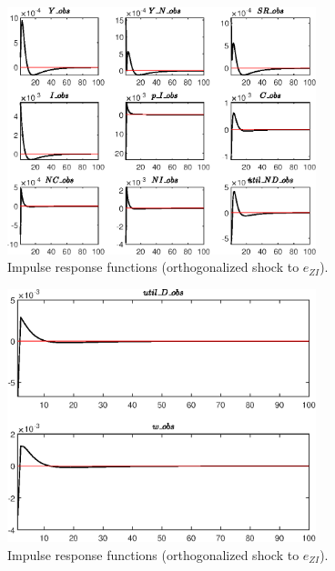 \begin{figure}[H]
\centering 
\includegraphics[width=0.80\textwidth]{RBC_sectoral/graphs/RBC_sectoral_IRF_e_ZI1}
\caption{Impulse response functions (orthogonalized shock to ${e_{ZI}}$).}\label{Fig:IRF:e_ZI:1}
\end{figure}
 
\begin{figure}[H]
\centering 
\includegraphics[width=0.80\textwidth]{RBC_sectoral/graphs/RBC_sectoral_IRF_e_ZI2}
\caption{Impulse response functions (orthogonalized shock to ${e_{ZI}}$).}\label{Fig:IRF:e_ZI:2}
\end{figure}
 
